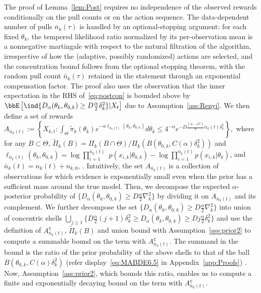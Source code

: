 \documentclass[11pt]{article}
\begin{document}
         The proof of Lemma~\ref{lem:Post} requires no independence of the observed rewards conditionally on the pull counts or on the action sequence. The data-dependent number of pulls $\bar n_k(\tau)$ is handled by an optional-stopping argument: for each fixed $\theta_k$, the tempered likelihood ratio normalized by its per-observation mean is a nonnegative martingale with respect to the natural filtration of the algorithm, irrespective of how the (adaptive, possibly randomized) actions are selected, and the concentration bound follows from the optional stopping theorem, with the random pull count $\bar n_k(\tau)$ retained in the statement through an exponential compensation factor. 
         The proof also uses the observation that the inner expectation in the RHS of~\eqref{eq:postcon} is bounded above by $ \bbE\left[ \ind\{D_{\alpha}(\theta_k,\theta_{0,k}) \geq D \frac{\alpha}{2} \delta_k^2  \} | X_{t} \right]$ due to Assumption~\ref{ass:Renyi}.   We then define a set of rewards
\(A_{\bar n_k(t)} := \left\{ X_{k,t}: \int_{\Theta} \tilde \pi_k(\theta_k) e^{-\alpha \ell_{\bar n_k(t)}(\theta_k,\theta_{0,k})}d\theta_k \leq 4^{-\alpha} e^{-D \frac{(\alpha-\alpha^2)}{8} \bar n_k(t)\delta_k^2}  \right\},\) where for any $B\subset \Theta$, $\tilde \Pi_k(B) = \Pi_k(B\cap \Theta)/\Pi_k(B\left(\theta_{0,k},C(\alpha)\delta_k^2 \right))$ and $\ell_{\bar n_k(t)}(\theta_k,\theta_{0,k})= \log \prod_{i=1}^{\bar n_k(t)}$ $  p(x_{i,k}|\theta_{0,k})
- \log {\prod_{i=1}^{\bar n_k(t)} p(x_{i,k}|\theta_k)}$, and $\bar n_k(t)= n_k(t)+n_{k,0}$, . Intuitively, the set $A_{\bar n_k(t)}$ is a collection of observations for which evidence is exponentially small even when the prior has a sufficient mass around the true model. Then, we decompose the expected $\alpha$-posterior probability of $\{D_{\alpha}(\theta_k,\theta_{0,k}) \geq D \frac{\alpha}{2} \nabla_k^2  \}$ by dividing it on $A_{\bar n_k(t)}$ and its complement. We further decompose the set $\{D_{\alpha}(\theta_k,\theta_{0,k}) \geq D \frac{\alpha}{2} \nabla_k^2  \}$ into union of concentric shells  $\bigcup_{j\geq 1} \Big\{D\frac{\alpha}{2} (j+1) \delta_k^2 \geq D_{\alpha}(\theta_k,\theta_{0,k}) \geq D j \frac{\alpha}{2} \delta_k^2  \Big\}$ and use the definition of $A_{\bar n_k(t)}^\mathtt{c}$, $\tilde \Pi_k(B)$ and union bound with Assumption~\ref{ass:prior2} to compute a summable bound on the term with $A_{\bar n_k(t)}^\mathtt{c}$. The summand in the bound is the ratio of the prior probability of the above shells to that of the ball $B\left(\theta_{0,k},C(\alpha)\delta_k^2 \right)$  (refer display~\eqref{eq:MABDE6.5} in Appendix~\ref{app:Proofs}) . Now, Assumption~\ref{ass:prior2}, which bounds this ratio, enables us to compute a finite and exponentially decaying bound on the term with $A_{\bar n_k(t)}^\mathtt{c}$. 
\end{document}
